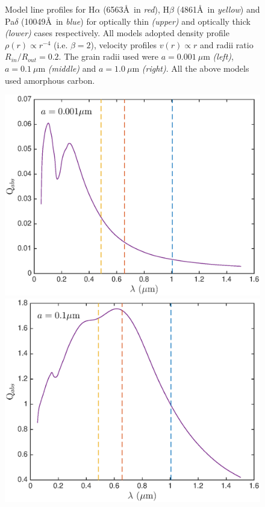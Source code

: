 \documentclass[useAMS,usenatbib,usegraphicx]{mnras}
\begin{document}
\begin{figure}
\caption{Model line profiles for H$\alpha$ (6563\AA\ in \textit{red}), H$\beta$ (4861\AA\ in \textit{yellow}) and Pa$\delta$ (10049\AA\ in \textit{blue}) for optically thin \textit{(upper)} and  optically thick \textit{(lower)} cases respectively.  All models adopted density profile $\rho(r) \propto r^{-4}$ (i.e. $\beta = 2$), velocity profiles $v(r) \propto r$ and radii ratio $R_{in}/R_{out}=0.2$.  The grain radii used were $a=0.001~\mu$m \textit{(left)}, $a=0.1~\mu$m \textit{(middle)} and $a=1.0~\mu$m \textit{(right)}. All the above models used amorphous carbon.}
\label{wav_dep}
\end{figure}

\begin{figure}
\includegraphics[trim =15 0 45 0,clip=true,scale=0.33]{Qabs_a0_001} \hspace{0.5mm}
\includegraphics[trim =45 0 45 0,clip=true,scale=0.33]{Qabs_a0_1} \hspace{0.5mm}

\end{figure}
\end{document}
